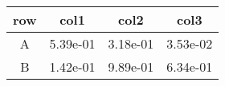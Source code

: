 \begin{tabular}{cccc}
\toprule
row&col1&col2&col3\tabularnewline
\midrule
A&5.39e-01&3.18e-01&3.53e-02\tabularnewline
B&1.42e-01&9.89e-01&6.34e-01\tabularnewline
\bottomrule
\end{tabular}
